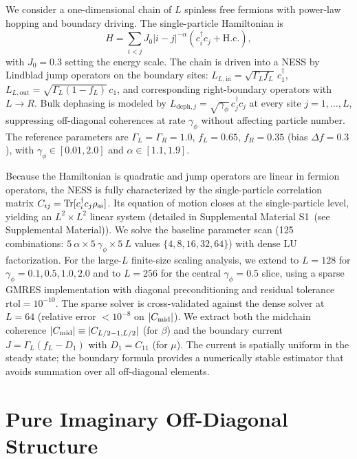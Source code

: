 \documentclass[aps,prb,twocolumn,superscriptaddress,floatfix]{revtex4-2}
\begin{document}
We consider a one-dimensional chain of $L$ spinless free fermions with power-law hopping and boundary driving. The single-particle Hamiltonian is
\begin{equation}
H = \sum_{i<j} J_0 |i-j|^{-\alpha} (c_i^\dagger c_j + \text{H.c.}),
\label{eq:Hamiltonian}
\end{equation}
with $J_0 = 0.3$ setting the energy scale. The chain is driven into a NESS by Lindblad jump operators on the boundary sites: $L_{L,\mathrm{in}} = \sqrt{\Gamma_L f_L}\, c_1^\dagger$, $L_{L,\mathrm{out}} = \sqrt{\Gamma_L(1-f_L)}\, c_1$, and corresponding right-boundary operators with $L \to R$. Bulk dephasing is modeled by $L_{\mathrm{deph},j} = \sqrt{\gamma_\phi}\, c_j^\dagger c_j$ at every site $j = 1,\dots,L$, suppressing off-diagonal coherences at rate $\gamma_\phi$ without affecting particle number. The reference parameters are $\Gamma_L = \Gamma_R = 1.0$, $f_L = 0.65$, $f_R = 0.35$ (bias $\Delta f = 0.3$), with $\gamma_\phi \in [0.01, 2.0]$ and $\alpha \in [1.1, 1.9]$.

Because the Hamiltonian is quadratic and jump operators are linear in fermion operators, the NESS is fully characterized by the single-particle correlation matrix $C_{ij} = \mathrm{Tr}[c_i^\dagger c_j \rho_{\rm ss}]$. Its equation of motion closes at the single-particle level, yielding an $L^2 \times L^2$ linear system (detailed in Supplemental Material S1~(see Supplemental Material)). We solve the baseline parameter scan (125 combinations: $5~\alpha \times 5~\gamma_\phi \times 5~L$ values $\{4, 8, 16, 32, 64\}$) with dense LU factorization. For the large-$L$ finite-size scaling analysis, we extend to $L = 128$ for $\gamma_\phi = 0.1, 0.5, 1.0, 2.0$ and to $L = 256$ for the central $\gamma_\phi = 0.5$ slice, using a sparse GMRES implementation with diagonal preconditioning and residual tolerance $\mathrm{rtol} = 10^{-10}$. The sparse solver is cross-validated against the dense solver at $L = 64$ (relative error $< 10^{-8}$ on $|C_{\rm mid}|$). We extract both the midchain coherence $|C_{\rm mid}| \equiv |C_{L/2-1, L/2}|$ (for $\beta$) and the boundary current $J = \Gamma_L(f_L - D_1)$ with $D_1 = C_{11}$ (for $\mu$). The current is spatially uniform in the steady state; the boundary formula provides a numerically stable estimator that avoids summation over all off-diagonal elements.

\section{Pure Imaginary Off-Diagonal Structure}
\label{sec:imag}
\end{document}
